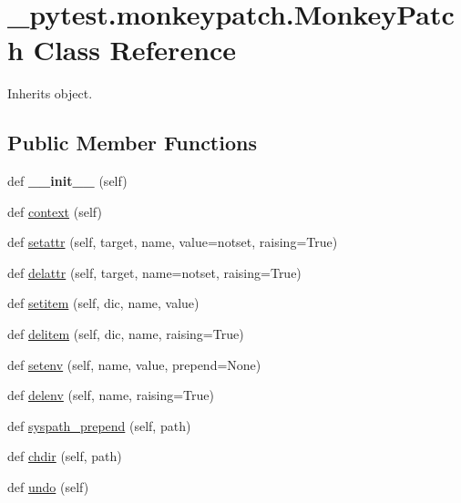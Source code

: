 \hypertarget{class__pytest_1_1monkeypatch_1_1_monkey_patch}{}\section{\+\_\+pytest.\+monkeypatch.\+Monkey\+Patch Class Reference}
\label{class__pytest_1_1monkeypatch_1_1_monkey_patch}


Inherits object.

\subsection*{Public Member Functions}
\begin{DoxyCompactItemize}
\item 
\mbox{\label{class__pytest_1_1monkeypatch_1_1_monkey_patch_a1079fb579b5b11fffae63d2bb06bb3d8}} 
def {\bfseries \+\_\+\+\_\+init\+\_\+\+\_\+} (self)
\item 
def \hyperlink{class__pytest_1_1monkeypatch_1_1_monkey_patch_aa9f369b562c70493a77a04cb9831b73c}{context} (self)
\item 
def \hyperlink{class__pytest_1_1monkeypatch_1_1_monkey_patch_a5907e4038adc542852aa11669c75d735}{setattr} (self, target, name, value=notset, raising=True)
\item 
def \hyperlink{class__pytest_1_1monkeypatch_1_1_monkey_patch_a4156b2c944fb97594323cf2dd7c09ccc}{delattr} (self, target, name=notset, raising=True)
\item 
def \hyperlink{class__pytest_1_1monkeypatch_1_1_monkey_patch_a188f5623428b6b29b94e5144bc2d75b3}{setitem} (self, dic, name, value)
\item 
def \hyperlink{class__pytest_1_1monkeypatch_1_1_monkey_patch_a8e8bae3db12d84514a9992f01e800d90}{delitem} (self, dic, name, raising=True)
\item 
def \hyperlink{class__pytest_1_1monkeypatch_1_1_monkey_patch_a53fc05d4431d1790747d9ce7e82ce105}{setenv} (self, name, value, prepend=None)
\item 
def \hyperlink{class__pytest_1_1monkeypatch_1_1_monkey_patch_a873307491f2c4eef2ebb1cf8a5702dbd}{delenv} (self, name, raising=True)
\item 
def \hyperlink{class__pytest_1_1monkeypatch_1_1_monkey_patch_a0f6b909b0c6dfd6873488c43feb22bd5}{syspath\+\_\+prepend} (self, path)
\item 
def \hyperlink{class__pytest_1_1monkeypatch_1_1_monkey_patch_a0557e1c8f8d7e3738eed674f21c6addc}{chdir} (self, path)
\item 
def \hyperlink{class__pytest_1_1monkeypatch_1_1_monkey_patch_a0c15865c3de639e2501f49d164aaf7c4}{undo} (self)
\end{DoxyCompactItemize}


